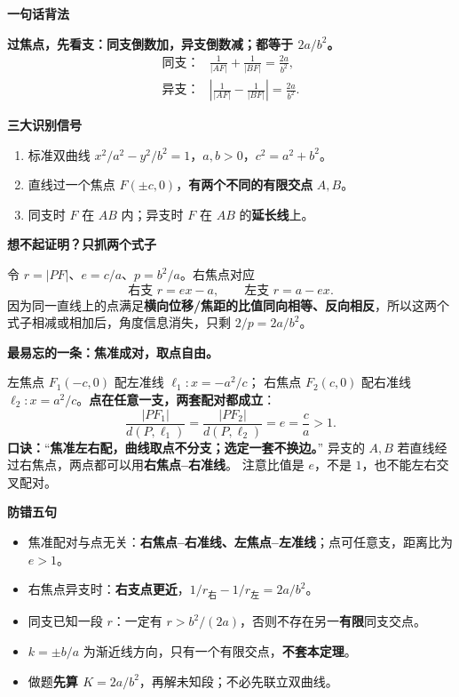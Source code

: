 \clearpage
\begin{summarybox}
  \textbf{\textcolor{CSummary}{一句话背法}}

  \textbf{过焦点，先看支：同支倒数加，异支倒数减；都等于 $2a/b^2$。}
  \[
    \boxed{\begin{array}{ll}
       \text{同支：}&\displaystyle\frac1{|AF|}+\frac1{|BF|}=\frac{2a}{b^2},\\[7pt]
       \text{异支：}&\displaystyle\left|\frac1{|AF|}-\frac1{|BF|}\right|=\frac{2a}{b^2}.
    \end{array}}
  \]

  \medskip
  \textbf{\textcolor{CSummary}{三大识别信号}}
  \begin{enumerate}[leftmargin=*,itemsep=0.35em,topsep=0.3em]
    \item 标准双曲线 $x^2/a^2-y^2/b^2=1$，$a,b>0$，$c^2=a^2+b^2$。
    \item 直线过一个焦点 $F(\pm c,0)$，\textbf{有两个不同的有限交点} $A,B$。
    \item 同支时 $F$ 在 $AB$ 内；异支时 $F$ 在 $AB$ 的\textbf{延长线}上。
  \end{enumerate}

  \medskip
  \textbf{\textcolor{CSummary}{想不起证明？只抓两个式子}}

  令 $r=|PF|$、$e=c/a$、$p=b^2/a$。右焦点对应
  \[
    \text{右支 }r=ex-a,\qquad \text{左支 }r=a-ex.
  \]
  因为同一直线上的点满足\textbf{横向位移/焦距的比值同向相等、反向相反}，所以这两个式子相减或相加后，角度信息消失，只剩 $2/p=2a/b^2$。

  \medskip

  \textbf{\textcolor{CSummary}{最易忘的一条：焦准成对，取点自由。}}

  左焦点 $F_1(-c,0)$ 配左准线 $\ell_1:x=-a^2/c$；
  右焦点 $F_2(c,0)$ 配右准线 $\ell_2:x=a^2/c$。\textbf{点在任意一支，两套配对都成立}：
  \[
    \boxed{\frac{|PF_1|}{d(P,\ell_1)}
       =\frac{|PF_2|}{d(P,\ell_2)}
       =e=\frac ca>1}.
  \]
  \textbf{口诀：}“\textbf{焦准左右配，曲线取点不分支；选定一套不换边。}”
  异支的 $A,B$ 若直线经过右焦点，两点都可以用\textbf{右焦点--右准线}。
  注意比值是 $e$，不是 $1$，也不能左右交叉配对。

  \medskip
  \textbf{\textcolor{CSummary}{防错五句}}
  \begin{itemize}[leftmargin=*,itemsep=0.3em,topsep=0.3em]
    \item 焦准配对与点无关：\textbf{右焦点--右准线、左焦点--左准线}；点可任意支，距离比为 $e>1$。
    \item 右焦点异支时：\textbf{右支点更近}，$1/r_{\text{右}}-1/r_{\text{左}}=2a/b^2$。
    \item 同支已知一段 $r$：一定有 $r>b^2/(2a)$，否则不存在另一\textbf{有限}同支交点。
    \item $k=\pm b/a$ 为渐近线方向，只有一个有限交点，\textbf{不套本定理}。
    \item 做题\textbf{先算 $K=2a/b^2$}，再解未知段；不必先联立双曲线。
  \end{itemize}


\end{summarybox}
